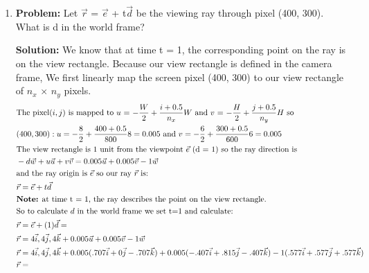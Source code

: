 \documentclass[a4paper, 12pt]{article}
\begin{document}
\begin{enumerate}
    \item \textbf{Problem:} Let $\vec{r}$ = $\vec{e}$ + t$\vec{d}$ be the viewing ray through pixel (400, 300). What is d in the world
frame?

        \textbf{Solution:} We know that at time t = 1, the corresponding point on the ray is on the view rectangle. Because our view rectangle is defined in the camera frame,  We first linearly map the screen pixel (400, 300) to our view rectangle of $n_x$ $\times$ $n_y$ pixels.
    \begin{align*}
        &\text{The pixel$(i, j)$ is mapped to $u$ = $-\frac{W}{2} + \frac{i + 0.5}{n_x}W$ and $v$ = $-\frac{H}{2} + \frac{j + 0.5}{n_y}H$ so}\\
        &(400, 300) : u = -\frac{8}{2} + \frac{400 + 0.5}{800}8 = 0.005 \text{ and } v = -\frac{6}{2} + \frac{300 + 0.5}{600}6 = 0.005\\
        &\text{The view rectangle is 1 unit from the viewpoint $\vec{e}$ (d = 1) so the ray direction is}\\
        &-d\vec{w} + u\vec{u} + v\vec{v} = 0.005\vec{u} + 0.005\vec{v} - 1\vec{w}\\
        &\text{and the ray origin is $\vec{e}$ so our ray $\vec{r}$ is:}\\
        &\vec{r} = \vec{e} + t\vec{d}\\
        &\text{\textbf{Note:} at time t = 1, the ray describes the point on the view rectangle.}\\
        &\text{So to calculate $d$ in the world frame we set t=1 and calculate:}\\
        &\vec{r} = \vec{e} + (1)\vec{d} = \\
        &\vec{r} = 4\vec{i}, 4\vec{j}, 4\vec{k} + 0.005\vec{u} + 0.005\vec{v} - 1\vec{w}\\
        &\vec{r} = 4\vec{i}, 4\vec{j}, 4\vec{k} + 0.005(.707\vec{i} + 0\vec{j} - .707\vec{k}) + 0.005(-.407\vec{i} + .815\vec{j} - .407\vec{k}) - 1(.577\vec{i} + .577\vec{j} + .577\vec{k})\\
        &\vec{r} = 
    \end{align*}

\end{enumerate}
\end{document}
